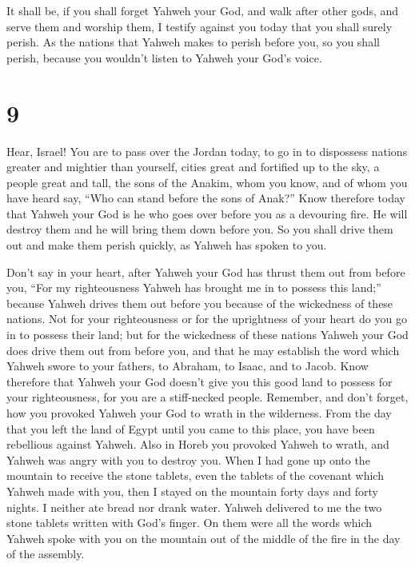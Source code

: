  It shall be, if you shall forget Yahweh your God, and walk
after other gods, and serve them and worship them, I testify against you
today that you shall surely perish.  As the nations that
Yahweh makes to perish before you, so you shall perish, because you
wouldn't listen to Yahweh your God's voice.

\hypertarget{section-8}{%
\section{9}\label{section-8}}

 Hear, Israel! You are to pass over the Jordan today, to go
in to dispossess nations greater and mightier than yourself, cities
great and fortified up to the sky,  a people great and tall,
the sons of the Anakim, whom you know, and of whom you have heard say,
``Who can stand before the sons of Anak?''  Know therefore
today that Yahweh your God is he who goes over before you as a devouring
fire. He will destroy them and he will bring them down before you. So
you shall drive them out and make them perish quickly, as Yahweh has
spoken to you.

 Don't say in your heart, after Yahweh your God has thrust
them out from before you, ``For my righteousness Yahweh has brought me
in to possess this land;'' because Yahweh drives them out before you
because of the wickedness of these nations.  Not for your
righteousness or for the uprightness of your heart do you go in to
possess their land; but for the wickedness of these nations Yahweh your
God does drive them out from before you, and that he may establish the
word which Yahweh swore to your fathers, to Abraham, to Isaac, and to
Jacob.  Know therefore that Yahweh your God doesn't give you
this good land to possess for your righteousness, for you are a
stiff-necked people.  Remember, and don't forget, how you
provoked Yahweh your God to wrath in the wilderness. From the day that
you left the land of Egypt until you came to this place, you have been
rebellious against Yahweh.  Also in Horeb you provoked
Yahweh to wrath, and Yahweh was angry with you to destroy you.
 When I had gone up onto the mountain to receive the stone
tablets, even the tablets of the covenant which Yahweh made with you,
then I stayed on the mountain forty days and forty nights. I neither ate
bread nor drank water.  Yahweh delivered to me the two
stone tablets written with God's finger. On them were all the words
which Yahweh spoke with you on the mountain out of the middle of the
fire in the day of the assembly.

